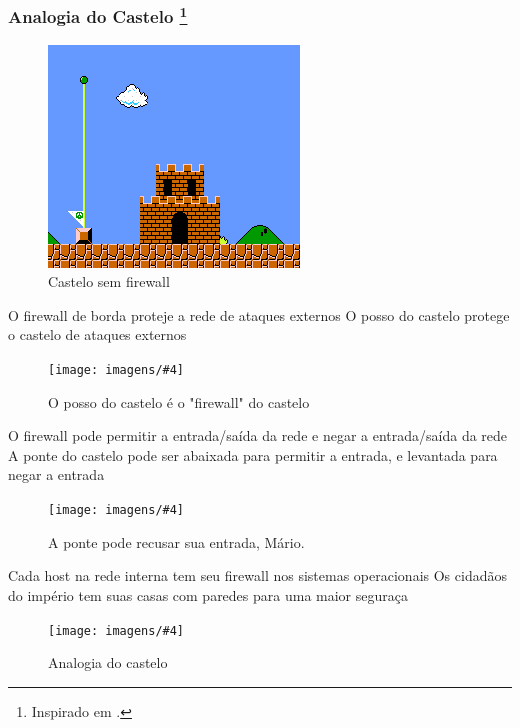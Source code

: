 \begin{frame}
	\frametitle{Analogia do Castelo \footnote{Inspirado em \cite{talal}.}}

	\begin{figure}
		\centering
		\includegraphics[height=.75\textheight]{imagens/castelo-mario.png}
		\caption{Castelo sem firewall}
	\end{figure}

\end{frame}

\newcommand{\analogia}[5][height=.5\textheight]{
	\begin{frame}
	\begin{block}{#2}
		#3
		\begin{figure}
			\centering
			\texttt{[image: imagens/\#4]}
			\caption{#5}
		\end{figure}
	\end{block}
	\end{frame}
}
\analogia	{O firewall de borda proteje a rede de ataques externos}
		{O posso do castelo protege o castelo de ataques externos}
		{castelo.jpg}
		{O posso do castelo é o "firewall" do castelo}

\analogia	{O firewall pode permitir a entrada/saída da rede e negar a entrada/saída da rede}
		{A ponte do castelo pode ser abaixada para permitir a entrada, e levantada para negar a entrada}
		{castelo-ponte.jpg}
		{A ponte pode recusar sua entrada, Mário.}

\analogia	{Cada host na rede interna tem seu firewall nos sistemas operacionais}
		{Os cidadãos do império tem suas casas com paredes para uma maior seguraça}
		{castelo-analogia.png}
		{Analogia do castelo \cite{tcpip}}

